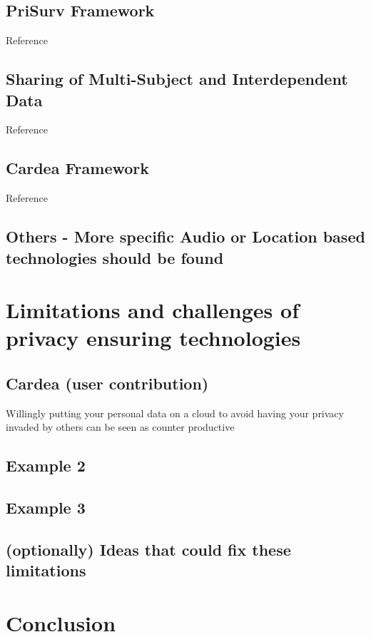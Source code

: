 \documentclass[conference]{IEEEtran}
\begin{document}
\subsection{PriSurv Framework}
Reference \cite{chinomi2008PriSurv}

\subsection{Sharing of Multi-Subject and Interdependent Data}
Reference \cite{olteanu2018consensual}

\subsection{Cardea Framework}
Reference \cite{shu2016cardea}

\subsection{Others - More specific Audio or Location based technologies should be found}


\section{Limitations and challenges of privacy ensuring technologies}\label{Limitations}
\subsection{Cardea (user contribution)}
Willingly putting your personal data on a cloud to avoid having your privacy invaded by others can be seen as counter productive
\subsection{Example 2}
\subsection{Example 3}
\subsection{(optionally) Ideas that could fix these limitations}

\section{Conclusion}\label{Conclusion}
\end{document}
